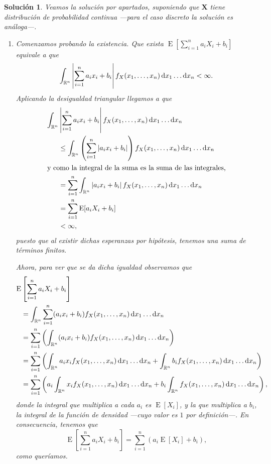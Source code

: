 \documentclass[
  a4paper,
  spanish,
  12pt,
]{scrartcl}
\theoremstyle{ejercicio-style}
\theoremstyle{remark-style}
\newtheorem*{sol}{Solución}
\begin{document}
\begin{sol}
  Veamos la solución por apartados, suponiendo que \(\symbf{X} \) tiene distribución de probabilidad continua ---para el caso discreto la solución es análoga---. \begin{enumerate}
    \item Comenzamos probando la existencia. Que exista \(\operatorname{E}\left[\sum_{i=1}^n a_iX_i + b_i\right]\) equivale a que \[
      \int_{\mathbb R^n}\left|\sum_{i=1}^n a_ix_i + b_i\right| f_X(x_1, \dots, x_n)\dif x_1\dots\dif x_n < \infty.
    \] Aplicando la desigualdad triangular llegamos a que \begin{align*}
      \int_{\mathbb R^n}&\left|\sum_{i=1}^n a_ix_i + b_i\right| f_X(x_1, \dots, x_n)\dif x_1\dots\dif x_n\\
        &\leq \int_{\mathbb R^n}\left(\sum_{i=1}^n \left|a_ix_i + b_i\right|\right) f_X(x_1, \dots, x_n)\dif x_1\dots\dif x_n\\
        \intertext{y como la integral de la suma es la suma de las integrales,}
        &= \sum_{i=1}^n\int_{\mathbb R^n}\left|a_ix_i + b_i\right| f_X(x_1, \dots, x_n)\dif x_1\dots\dif x_n\\
        &= \sum_{i=1}^n \operatorname{E}[a_iX_i + b_i]\\
        &< \infty,
    \end{align*} puesto que al existir dichas esperanzas por hipótesis, tenemos una suma de términos finitos.

    Ahora, para ver que se da dicha igualdad observamos que \begin{align*}
      \operatorname{E}&\left[\sum_{i=1}^n a_iX_i + b_i\right] \\
        &= \int_{\mathbb R^n}\sum_{i=1}^n (a_ix_i + b_i) f_X(x_1, \dots, x_n)\dif x_1\dots\dif x_n\\
        &= \sum_{i=1}^n\left(\int_{\mathbb R^n} (a_ix_i + b_i) f_X(x_1, \dots, x_n)\dif x_1\dots\dif x_n\right)\\
        &= \sum_{i=1}^n\left(\int_{\mathbb R^n} a_ix_if_X(x_1, \dots, x_n)\dif x_1\dots\dif x_n + \int_{\mathbb R^n} b_if_X(x_1, \dots, x_n)\dif x_1\dots\dif x_n\right)\\
        &= \sum_{i=1}^n\left(a_i\int_{\mathbb R^n}x_if_X(x_1, \dots, x_n)\dif x_1\dots\dif x_n + b_i\int_{\mathbb R^n} f_X(x_1, \dots, x_n)\dif x_1\dots\dif x_n\right),
    \end{align*} donde la integral que multiplica a cada \(a_i\) es \(\operatorname{E}[X_i]\), y la que multiplica a \(b_i\), la integral de la función de densidad ---cuyo valor es \(1\) por definición---. En consecuencia, tenemos que \[
      \operatorname{E}\left[\sum_{i=1}^n a_iX_i + b_i\right] = \sum_{i=1}^n\left(a_i \operatorname{E}[X_i] + b_i\right),
    \] como queríamos.
  

\end{enumerate}
\end{sol}
\end{document}

